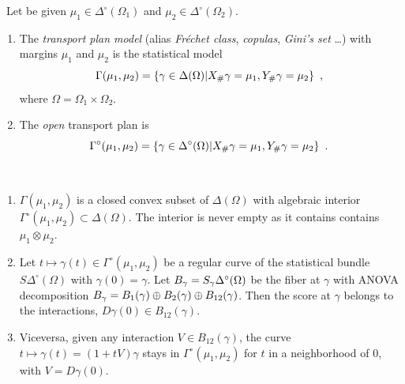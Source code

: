 \documentclass[12pt,a4paper]{amsart}
\begin{document}
\begin{definition}\ 
  Let be given $\mu_1 \in \Delta^\circ(\Omega_1)$ and $\mu_2 \in \Delta^\circ(\Omega_2)$.\begin{enumerate}
  \item  The \emph{transport plan model} (alias \emph{Fr\'echet class}, \emph{copulas}, \emph{Gini's set} \dots) with margins $\mu_1$ and $\mu_2$ is the statistical model
%
  \begin{equation*}
    \Gamma(\mu_1,\mu_2) = \left\{ \gamma \in \Delta(\Omega) \middle| X_\# \gamma = \mu_1, Y_\# \gamma = \mu_2 \right\} \ ,
  \end{equation*}
%
where $\Omega=\Omega_1 \times \Omega_2$.
\item  The \emph{open} transport plan is 
%
  \begin{equation*}
    \Gamma^\circ(\mu_1,\mu_2) = \setof{\gamma \in \Delta^\circ(\Omega)}{X_\# \gamma = \mu_1, Y_\# \gamma = \mu_2} \ .
  \end{equation*}
%
\end{enumerate}
\end{definition}

\begin{proposition}\ 
  \begin{enumerate}
  \item $\Gamma(\mu_1,\mu_2)$ is a closed convex subset of $\Delta(\Omega)$ with algebraic interior $\Gamma^\circ(\mu_1,\mu_2) \subset \Delta(\Omega)$. The interior is never empty as it contains  contains $\mu_1 \otimes \mu_2$.
  \item Let $t \mapsto \gamma(t) \in \Gamma^\circ(\mu_1,\mu_2)$ be a regular curve of the statistical bundle $S\Delta^\circ(\Omega)$ with $\gamma(0)=\gamma$. Let $B_{\gamma} = S_\gamma \Delta^\circ(\Omega)$ be the fiber at $\gamma$ with ANOVA decomposition $B_{\gamma} = B_1(\gamma) \oplus B_2(\gamma) \oplus B_{12}(\gamma)$. Then the score at $\gamma$ belongs to the interactions, $D\gamma(0) \in B_{12}(\gamma)$.
  \item Viceversa, given any interaction $V \in B_{12}(\gamma)$, the curve $t \mapsto \gamma(t) = (1+tV)\gamma$ stays in $\Gamma^\circ(\mu_1,\mu_2)$ for $t$ in a neighborhood of 0, with $V = D\gamma(0)$. 
\end{enumerate}
\end{proposition}
\end{document}
